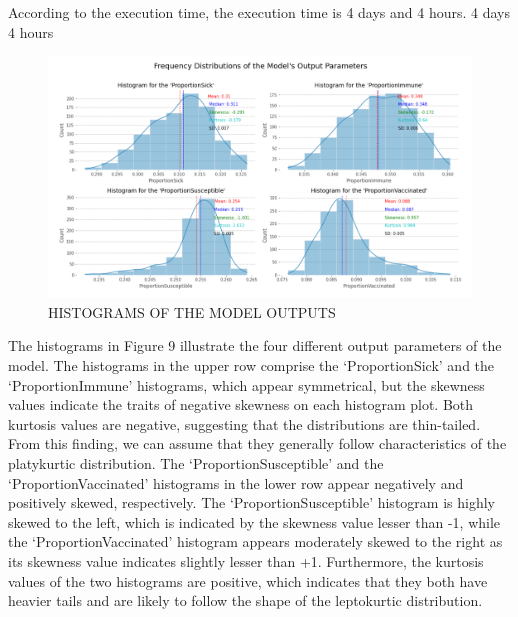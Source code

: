 \documentclass[smallextended]{svjour3}       %
\begin{document}
According to the execution time, the execution time is 4 days and 4 hours. 4 days 4 hours

\begin{figure}
	\centering
	\includegraphics[width=0.7\linewidth]{figures/histograms.png}
	\caption{HISTOGRAMS OF THE MODEL OUTPUTS\label{fig:histograms}}
\end{figure}

The histograms in Figure 9 illustrate the four different output parameters of the model. The histograms in the upper row comprise the ‘ProportionSick’ and the ‘ProportionImmune’ histograms, which appear symmetrical, but the skewness values indicate the traits of negative skewness on each histogram plot. Both kurtosis values are negative, suggesting that the distributions are thin-tailed. From this finding, we can assume that they generally follow characteristics of the platykurtic distribution. The ‘ProportionSusceptible’ and the ‘ProportionVaccinated’ histograms in the lower row appear negatively and positively skewed, respectively. The ‘ProportionSusceptible’ histogram is highly skewed to the left, which is indicated by the skewness value lesser than -1, while the ‘ProportionVaccinated’ histogram appears moderately skewed to the right as its skewness value indicates slightly lesser than +1. Furthermore, the kurtosis values of the two histograms are positive, which indicates that they both have heavier tails and are likely to follow the shape of the leptokurtic distribution.


\end{document}
